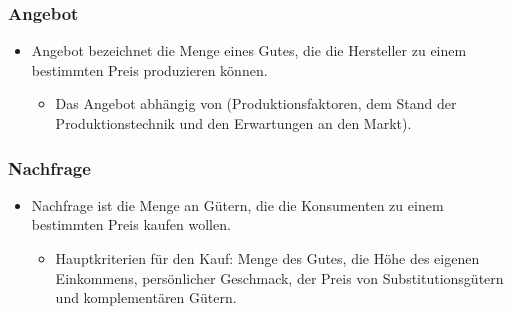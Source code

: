 \documentclass{beamer}
\begin{document}
\begin{frame}
\frametitle{Angebot}
  \begin{itemize}
    \item
Angebot bezeichnet die Menge eines Gutes, die die
Hersteller zu einem bestimmten Preis produzieren
können.
      \begin{itemize}
        \item
  Das Angebot abhängig von (Produktionsfaktoren, dem Stand
  der Produktionstechnik und den Erwartungen an den Markt).
      \end{itemize}
  \end{itemize}
\end{frame}

\begin{frame}
\frametitle{Nachfrage}
  \begin{itemize}
    \item
Nachfrage ist die Menge an Gütern, die die
Konsumenten zu einem bestimmten Preis kaufen wollen.

      \begin{itemize}
        \item
Hauptkriterien für den Kauf: Menge des Gutes, die Höhe des
eigenen Einkommens, persönlicher Geschmack, der Preis von
Substitutionsgütern und komplementären Gütern.
      \end{itemize}
  \end{itemize}
\end{frame}
\end{document}
